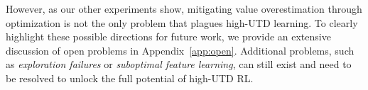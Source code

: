 However, as our other experiments show, mitigating value overestimation through optimization is not the only problem that plagues high-UTD learning. 
To clearly highlight these possible directions for future work, we provide an extensive discussion of open problems in Appendix~\ref{app:open}. 
Additional problems, such as \emph{exploration failures} or \emph{suboptimal feature learning}, can still exist and need to be resolved to unlock the full potential of high-UTD RL.
